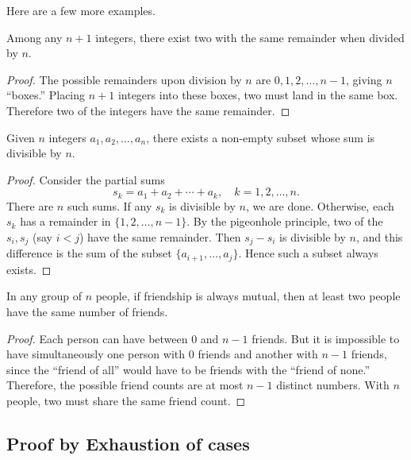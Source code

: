Here are a few more examples.

\begin{theorem}
Among any $n+1$ integers, there exist two with the same remainder when divided
by $n$.
\end{theorem}
\begin{proof}
The possible remainders upon division by $n$ are $0,1,2,\dots,n-1$, giving $n$
``boxes.'' Placing $n+1$ integers into these boxes, two must land in the same
box. Therefore two of the integers have the same remainder.
\end{proof}

\begin{theorem}
Given $n$ integers $a_1,a_2,\dots,a_n$, there exists a non-empty subset whose
sum is divisible by $n$.
\end{theorem}
\begin{proof}
Consider the partial sums
\[
s_k = a_1+a_2+\cdots+a_k, \quad k=1,2,\dots,n.
\]
There are $n$ such sums. If any $s_k$ is divisible by $n$, we are done. 
Otherwise, each $s_k$ has a remainder in $\{1,2,\dots,n-1\}$. By the
pigeonhole principle, two of the $s_i,s_j$ (say $i<j$) have the same remainder.
Then $s_j-s_i$ is divisible by $n$, and this difference is the sum of the
subset $\{a_{i+1},\dots,a_j\}$. Hence such a subset always exists.
\end{proof}

\begin{theorem}
In any group of $n$ people, if friendship is always mutual, then at least two
people have the same number of friends.
\end{theorem}
\begin{proof}
Each person can have between $0$ and $n-1$ friends. But it is impossible to
have simultaneously one person with $0$ friends and another with $n-1$ friends,
since the ``friend of all'' would have to be friends with the ``friend of none.''
Therefore, the possible friend counts are at most $n-1$ distinct numbers. With
$n$ people, two must share the same friend count.
\end{proof}

\subsection{Proof by Exhaustion of cases}

